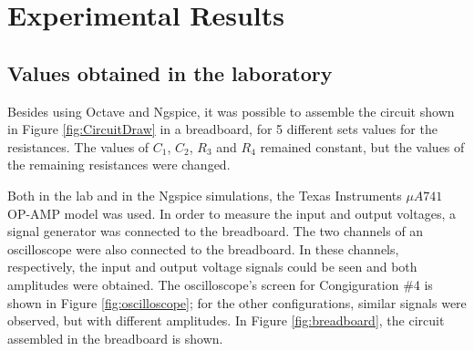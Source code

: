 \section{Experimental Results} \label{sec:experimental}

\subsection{Values obtained in the laboratory} \label{subsec:experimental_measuredvalues}

Besides using Octave and Ngspice, it was possible to assemble the circuit shown in Figure \ref{fig:CircuitDraw} in a breadboard, for 5 different sets values for the resistances. The values of $C_1$, $C_2$, $R_3$ and $R_4$ remained constant, but the values of the remaining resistances were changed.
\par
Both in the lab and in the Ngspice simulations, the Texas Instruments $\mu A741$ OP-AMP model was used. In order to measure the input and output voltages, a signal generator was connected to the breadboard. The two channels of an oscilloscope were also connected to the breadboard. In these channels, respectively, the input and output voltage signals could be seen and both amplitudes were obtained. The oscilloscope's screen for Congiguration $\#$4 is shown in Figure \ref{fig:oscilloscope}; for the other configurations, similar signals were observed, but with different amplitudes. In Figure \ref{fig:breadboard}, the circuit assembled in the breadboard is shown.

